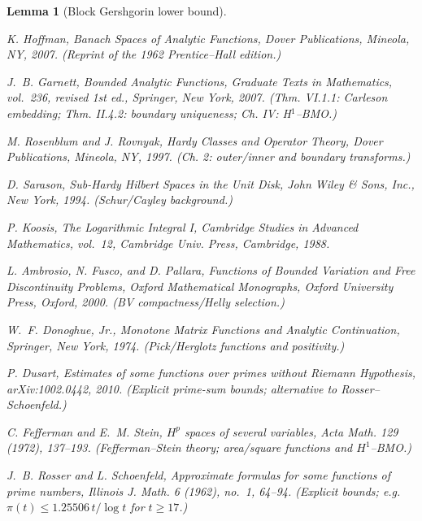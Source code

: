 \documentclass[11pt]{article}
\newtheorem{lemma}{Lemma}[section]
\theoremstyle{definition}
\theoremstyle{remark}
\begin{document}
\begin{lemma}[Block Gershgorin lower bound]
\begin{thebibliography}{99}
 K. Hoffman, \emph{Banach Spaces of Analytic Functions}, Dover Publications, Mineola, NY, 2007. (Reprint of the 1962 Prentice--Hall edition.)




 J.~B. Garnett, \emph{Bounded Analytic Functions}, Graduate Texts in Mathematics, vol.~236, revised 1st ed., Springer, New York, 2007. (Thm. VI.1.1: Carleson embedding; Thm. II.4.2: boundary uniqueness; Ch. IV: H$^1$–BMO.)




 M. Rosenblum and J. Rovnyak, \emph{Hardy Classes and Operator Theory}, Dover Publications, Mineola, NY, 1997. (Ch. 2: outer/inner and boundary transforms.)




 D. Sarason, \emph{Sub-Hardy Hilbert Spaces in the Unit Disk}, John Wiley \& Sons, Inc., New York, 1994. (Schur/Cayley background.)




 P. Koosis, \emph{The Logarithmic Integral I}, Cambridge Studies in Advanced Mathematics, vol.~12, Cambridge Univ. Press, Cambridge, 1988.




 L. Ambrosio, N. Fusco, and D. Pallara, \emph{Functions of Bounded Variation and Free Discontinuity Problems}, Oxford Mathematical Monographs, Oxford University Press, Oxford, 2000. (BV compactness/Helly selection.)




 W.~F. Donoghue, Jr., \emph{Monotone Matrix Functions and Analytic Continuation}, Springer, New York, 1974. (Pick/Herglotz functions and positivity.)




 P. Dusart, Estimates of some functions over primes without Riemann Hypothesis, arXiv:1002.0442, 2010. (Explicit prime-sum bounds; alternative to Rosser--Schoenfeld.)




 C. Fefferman and E.~M. Stein, $H^p$ spaces of several variables, \emph{Acta Math.} 129 (1972), 137--193. (Fefferman--Stein theory; area/square functions and $H^1$--BMO.)




 J.~B. Rosser and L. Schoenfeld, Approximate formulas for some functions of prime numbers, \emph{Illinois J. Math.} 6 (1962), no.~1, 64--94. (Explicit bounds; e.g. $\pi(t)\le 1.25506\,t/\log t$ for $t\ge 17$.)





\end{thebibliography}
\end{lemma}
\end{document}
